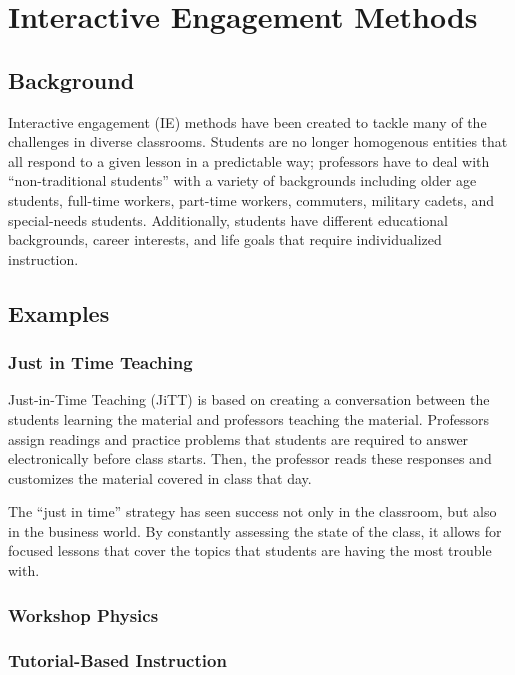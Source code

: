 \chapter[Chapter 3: Interactive Engagement Methods]{Interactive Engagement Methods}

\section{Background}

Interactive engagement (IE) methods have been created to tackle many of the challenges in diverse classrooms. Students are no longer homogenous entities that all respond to a given lesson in a predictable way; professors have to deal with ``non-traditional students'' with a variety of backgrounds including older age students, full-time workers, part-time workers, commuters, military cadets, and special-needs students. Additionally, students have different educational backgrounds, career interests, and life goals that require individualized instruction\cite{novak1999}.

\section{Examples}

\subsection{Just in Time Teaching}

Just-in-Time Teaching (JiTT) is based on creating a conversation between the students learning the material and professors teaching the material. Professors assign readings and practice problems that students are required to answer electronically before class starts. Then, the professor reads these responses and customizes the material covered in class that day\cite{novak1999}.

The ``just in time'' strategy has seen success not only in the classroom, but also in the business world. By constantly assessing the state of the class, it allows for focused lessons that cover the topics that students are having the most trouble with.

\subsection{Workshop Physics}
\subsection{Tutorial-Based Instruction}
